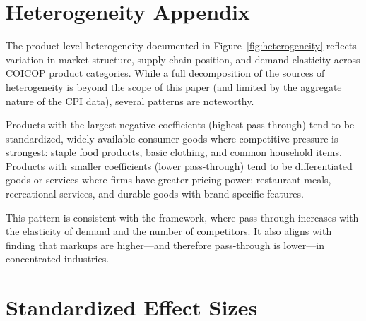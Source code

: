 \documentclass[12pt]{article}
\begin{document}
\section{Heterogeneity Appendix}
\label{app:heterogeneity}

The product-level heterogeneity documented in Figure~\ref{fig:heterogeneity} reflects variation in market structure, supply chain position, and demand elasticity across COICOP product categories. While a full decomposition of the sources of heterogeneity is beyond the scope of this paper (and limited by the aggregate nature of the CPI data), several patterns are noteworthy.

Products with the largest negative coefficients (highest pass-through) tend to be standardized, widely available consumer goods where competitive pressure is strongest: staple food products, basic clothing, and common household items. Products with smaller coefficients (lower pass-through) tend to be differentiated goods or services where firms have greater pricing power: restaurant meals, recreational services, and durable goods with brand-specific features.

This pattern is consistent with the \citet{weyl2013} framework, where pass-through increases with the elasticity of demand and the number of competitors. It also aligns with \citet{ganapati2020} finding that markups are higher---and therefore pass-through is lower---in concentrated industries.


\section{Standardized Effect Sizes}
\label{sec:sde}
\end{document}
